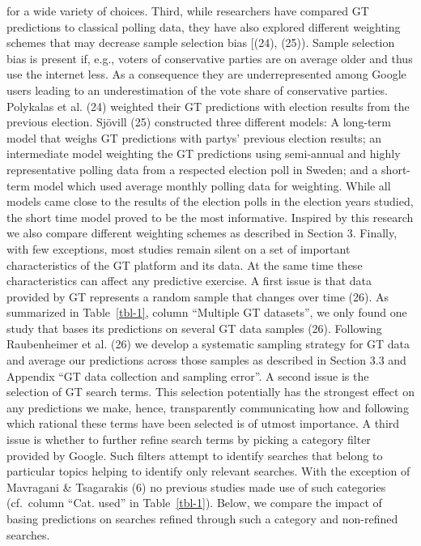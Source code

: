 \documentclass[
  letterpaper,
  DIV=11,
  numbers=noendperiod]{scrartcl}
\begin{document}
for a wide variety of choices. Third, while researchers have compared GT
predictions to classical polling data, they have also explored different
weighting schemes that may decrease sample selection bias {[}(24),
(25)). Sample selection bias is present if, e.g., voters of conservative
parties are on average older and thus use the internet less. As a
consequence they are underrepresented among Google users leading to an
underestimation of the vote share of conservative parties. Polykalas et
al. (24) weighted their GT predictions with election results from the
previous election. Sjövill (25) constructed three different models: A
long-term model that weighs GT predictions with partys' previous
election results; an intermediate model weighting the GT predictions
using semi-annual and highly representative polling data from a
respected election poll in Sweden; and a short-term model which used
average monthly polling data for weighting. While all models came close
to the results of the election polls in the election years studied, the
short time model proved to be the most informative. Inspired by this
research we also compare different weighting schemes as described in
Section 3. Finally, with few exceptions, most studies remain silent on a
set of important characteristics of the GT platform and its data. At the
same time these characteristics can affect any predictive exercise. A
first issue is that data provided by GT represents a random sample that
changes over time (26). As summarized in Table~\ref{tbl-1}, column
``Multiple GT datasets'', we only found one study that bases its
predictions on several GT data samples (26). Following Raubenheimer et
al. (26) we develop a systematic sampling strategy for GT data and
average our predictions across those samples as described in Section 3.3
and Appendix ``GT data collection and sampling error''. A second issue
is the selection of GT search terms. This selection potentially has the
strongest effect on any predictions we make, hence, transparently
communicating how and following which rational these terms have been
selected is of utmost importance. A third issue is whether to further
refine search terms by picking a category filter provided by Google.
Such filters attempt to identify searches that belong to particular
topics helping to identify only relevant searches. With the exception of
Mavragani \& Tsagarakis (6) no previous studies made use of such
categories (cf.~column ``Cat. used'' in Table~\ref{tbl-1}). Below, we
compare the impact of basing predictions on searches refined through
such a category and non-refined searches.
\end{document}
